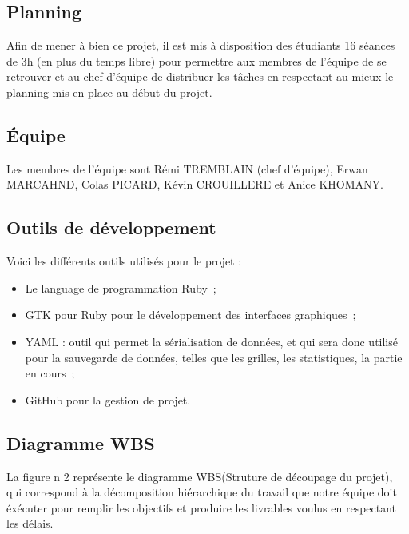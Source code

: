 \documentclass[11pt]{article}
\begin{document}
\subsection{Planning}

Afin de mener à bien ce projet, il est mis à disposition des étudiants 16 séances de 3h (en plus du temps libre) pour permettre aux membres de l'équipe de se retrouver et au chef d'équipe de distribuer les tâches en respectant au mieux le planning mis en place au début du projet.



\subsection{Équipe}

Les membres de l'équipe sont Rémi TREMBLAIN (chef d'équipe), Erwan MARCAHND, Colas PICARD, Kévin CROUILLERE et Anice KHOMANY.





\subsection{Outils de développement}

Voici les différents outils utilisés pour le projet :

\begin{itemize}
   \item Le language de programmation Ruby~;
   \item GTK pour Ruby pour le développement des interfaces graphiques~;
   \item YAML : outil qui permet la sérialisation de données, et qui sera donc utilisé pour la sauvegarde de données, telles que les grilles, les statistiques, la partie en cours~;
   \item GitHub pour la gestion de projet.
\end{itemize}

\newpage
\subsection{Diagramme WBS}

La figure n 2 représente le diagramme WBS(Struture de découpage du projet), qui correspond à la décomposition hiérarchique du travail que notre équipe doit éxécuter pour remplir les objectifs et produire les livrables voulus en respectant les délais.
	
\end{document}

